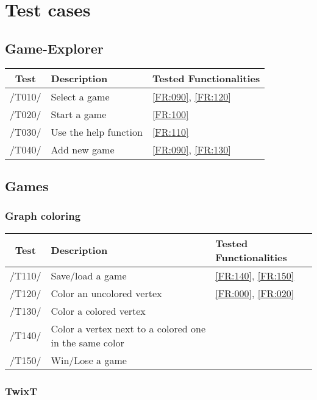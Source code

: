 \section{Test cases}

\subsection{Game-Explorer}

\begin{tabular}{cll}

\hline
{\bf Test} & {\bf Description} & {\bf Tested Functionalities} \\
\hline
/T010/ & Select a game & \ref{FR:090}, \ref{FR:120} \\
/T020/ & Start a game & \ref{FR:100} \\
/T030/ & Use the help function & \ref{FR:110} \\
/T040/ & Add new game & \ref{FR:090}, \ref{FR:130} \\
\hline

\end{tabular}

\subsection{Games}

\subsubsection{Graph coloring}

\begin{tabular}{cll}

\hline
{\bf Test} & {\bf Description} & {\bf Tested Functionalities} \\
\hline
/T110/ & Save/load a game & \ref{FR:140}, \ref{FR:150}\\
/T120/ & Color an uncolored vertex & \ref{FR:000}, \ref{FR:020}\\
/T130/ & Color a colored vertex & \\
/T140/ & Color a vertex next to a colored one in the same color & \\
/T150/ & Win/Lose a game & \\
\hline

\end{tabular}

\subsubsection{TwixT}

